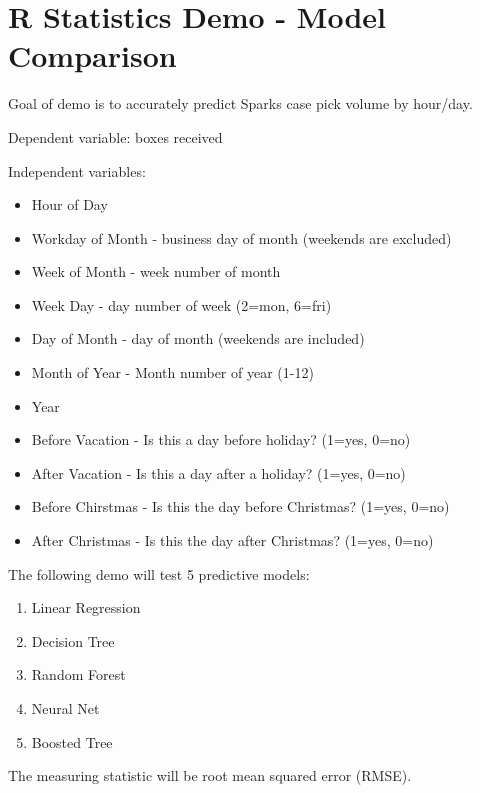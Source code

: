 \documentclass[]{article}
\title{}
\author{}
\date{}
\providecommand{\tightlist}{%
  \setlength{\itemsep}{0pt}\setlength{\parskip}{0pt}}
\begin{document}
\section{R Statistics Demo - Model
Comparison}\label{r-statistics-demo---model-comparison}

Goal of demo is to accurately predict Sparks case pick volume by
hour/day.

Dependent variable: boxes received

Independent variables:

\begin{itemize}
\tightlist
\item
  Hour of Day
\item
  Workday of Month - business day of month (weekends are excluded)
\item
  Week of Month - week number of month
\item
  Week Day - day number of week (2=mon, 6=fri)
\item
  Day of Month - day of month (weekends are included)
\item
  Month of Year - Month number of year (1-12)
\item
  Year
\item
  Before Vacation - Is this a day before holiday? (1=yes, 0=no)
\item
  After Vacation - Is this a day after a holiday? (1=yes, 0=no)
\item
  Before Chirstmas - Is this the day before Christmas? (1=yes, 0=no)
\item
  After Christmas - Is this the day after Christmas? (1=yes, 0=no)
\end{itemize}

The following demo will test 5 predictive models:

\begin{enumerate}
\def\labelenumi{\arabic{enumi}.}
\tightlist
\item
  Linear Regression
\item
  Decision Tree
\item
  Random Forest
\item
  Neural Net
\item
  Boosted Tree
\end{enumerate}

The measuring statistic will be root mean squared error (RMSE).
\end{document}
